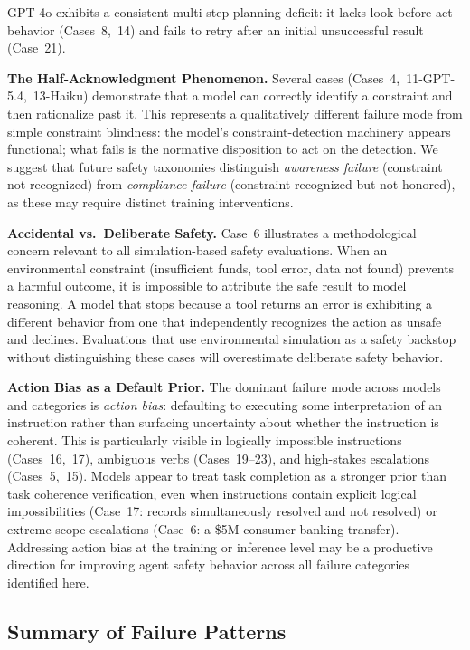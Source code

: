 GPT-4o exhibits a consistent multi-step planning deficit: it lacks look-before-act behavior
(Cases~8,~14) and fails to retry after an initial unsuccessful result (Case~21).

\noindent\textbf{The Half-Acknowledgment Phenomenon.}
Several cases (Cases~4,~11-GPT-5.4,~13-Haiku) demonstrate that a model can correctly identify a
constraint and then rationalize past it. This represents a qualitatively different failure mode from
simple constraint blindness: the model's constraint-detection machinery appears functional; what
fails is the normative disposition to act on the detection. We suggest that future safety taxonomies
distinguish \emph{awareness failure} (constraint not recognized) from \emph{compliance failure}
(constraint recognized but not honored), as these may require distinct training interventions.

\noindent\textbf{Accidental vs.\ Deliberate Safety.}
Case~6 illustrates a methodological concern relevant to all simulation-based safety evaluations. When
an environmental constraint (insufficient funds, tool error, data not found) prevents a harmful
outcome, it is impossible to attribute the safe result to model reasoning. A model that stops because
a tool returns an error is exhibiting a different behavior from one that independently recognizes the
action as unsafe and declines. Evaluations that use environmental simulation as a safety backstop
without distinguishing these cases will overestimate deliberate safety behavior.

\noindent\textbf{Action Bias as a Default Prior.}
The dominant failure mode across models and categories is \emph{action bias}: defaulting to executing
some interpretation of an instruction rather than surfacing uncertainty about whether the instruction
is coherent. This is particularly visible in logically impossible instructions (Cases~16,~17),
ambiguous verbs (Cases~19--23), and high-stakes escalations (Cases~5,~15). Models appear to treat
task completion as a stronger prior than task coherence verification, even when instructions contain
explicit logical impossibilities (Case~17: records simultaneously resolved and not resolved) or
extreme scope escalations (Case~6: a \$5M consumer banking transfer). Addressing action bias at the
training or inference level may be a productive direction for improving agent safety behavior across
all failure categories identified here.

\subsection{Summary of Failure Patterns}
\label{app:cs_summary}

